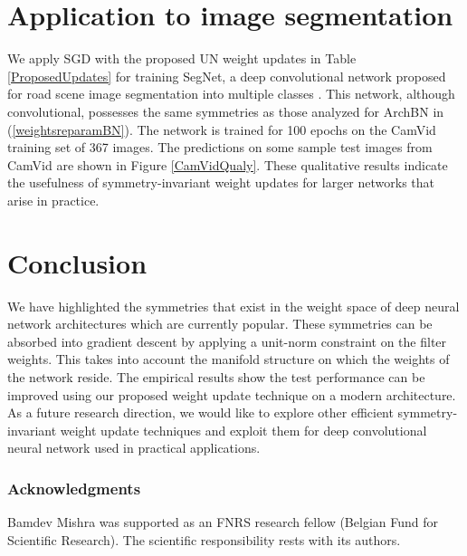 \documentclass{article} %
\newcommand{\changeBM}[1]{#1} %
\newcommand{\changeVB}[1]{#1} %
\begin{document}
\section{Application to image segmentation}
\label{DeepConvNets}
We \changeBM{apply SGD with the proposed UN weight updates in Table \ref{ProposedUpdates} for} training SegNet, a deep convolutional network proposed for road scene image segmentation into multiple classes \cite{SegNetarXiv}. This network, although convolutional, possesses the same symmetries as those analyzed for ArchBN in (\ref{weightsreparamBN}). The network \changeBM{is} trained for 100 epochs on the CamVid \cite{GabeDataset} training set of 367 images. The predictions on some sample test images from  CamVid are shown in Figure \ref{CamVidQualy}. These qualitative results indicate the usefulness of \changeBM{symmetry-invariant} weight updates for larger networks that arise in practice. 











\section{Conclusion}
\label{Conclusion}
We have highlighted the symmetries that exist in the weight space of deep neural network architectures which are currently popular. \changeVB{These symmetries can be absorbed into gradient descent by applying a unit-norm constraint on the filter weights. This takes into account the manifold structure on which the weights of the network reside. The empirical results show the test performance can be improved using our proposed weight update technique on a modern architecture}. \changeBM{As a future research direction,} we would \changeVB{like to explore other efficient symmetry-invariant weight update techniques and exploit them for deep convolutional neural network \changeBM{used in} practical applications}.



\subsubsection*{Acknowledgments}
Bamdev Mishra was supported as an FNRS research fellow (Belgian Fund for Scientific Research). The scientific responsibility rests with its authors.



\small
  

\end{document}
